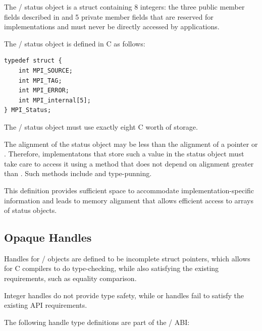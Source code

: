 The \MPI/ status object is a struct containing 8 integers: 
the three public member fields described in 
and 5 private member fields that are reserved for implementations and 
must never be directly accessed by applications.

The \MPI/ status object is defined in C as follows:
\begin{lstlisting}[language={[MPI]C}]
typedef struct {
    int MPI_SOURCE;
    int MPI_TAG;
    int MPI_ERROR;
    int MPI_internal[5];
} MPI_Status;
\end{lstlisting}
The \MPI/ status object must use exactly eight C  worth of storage.

\begin{implementors}
The alignment of the status object may be less than the alignment
of a pointer or .  Therefore, implementatons
that store such a value in the status object must take care to access
it using a method that does not depend on alignment greater than .
Such methods include  and type-punning.
\end{implementors}

\begin{rationale}
This definition provides sufficient space to accommodate implementation-specific 
information and leads to memory alignment that allows efficient access to arrays
of status objects.
\end{rationale}

\subsection{Opaque Handles}
\label{subsec:abi-opaque-handles}

Handles for \MPI/ objects are defined to be incomplete struct pointers, 
which allows for C compilers to do type-checking, while also satisfying 
the existing requirements, such as equality comparison.

\begin{rationale}
Integer handles do not provide type safety, while  or  handles 
fail to satisfy the existing API requirements.
\end{rationale}

The following handle type definitions are part of the \MPI/ ABI:

